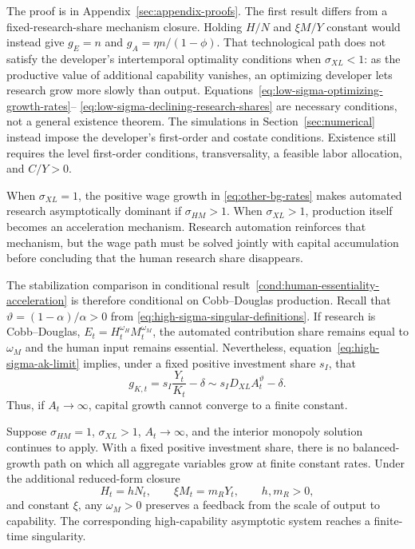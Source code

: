 The proof is in Appendix~\ref{sec:appendix-proofs}. The first result differs from a
fixed-research-share mechanism closure. Holding $H/N$ and
$\xi M/Y$ constant would instead give $g_E=n$ and
$g_A=\eta n/(1-\phi)$. That technological path does not satisfy the developer's
intertemporal optimality conditions when $\sigma_{XL}<1$: as the productive value of
additional capability vanishes, an optimizing developer lets research grow more
slowly than output. Equations~\eqref{eq:low-sigma-optimizing-growth-rates}--
\eqref{eq:low-sigma-declining-research-shares} are necessary conditions, not a
general existence theorem. The simulations in Section~\ref{sec:numerical} instead
impose the developer's first-order and costate conditions. Existence still requires
the level first-order conditions, transversality, a feasible labor allocation, and
$C/Y>0$.

When $\sigma_{XL}=1$, the positive wage growth in
\eqref{eq:other-bg-rates} makes automated research asymptotically dominant if
$\sigma_{HM}>1$. When $\sigma_{XL}>1$, production itself becomes an acceleration
mechanism. Research automation reinforces that mechanism, but the wage path must be
solved jointly with capital accumulation before concluding that the human research
share disappears.

The stabilization comparison in conditional
result~\ref{cond:human-essentiality-acceleration}
is therefore conditional on Cobb--Douglas production. Recall that
$\vartheta=(1-\alpha)/\alpha>0$ from
\eqref{eq:high-sigma-singular-definitions}.
If research is Cobb--Douglas, $E_t=H_t^{\omega_H}M_t^{\omega_M}$, the automated
contribution share remains equal to $\omega_M$ and the human input remains essential.
Nevertheless,
equation~\eqref{eq:high-sigma-ak-limit} implies, under a fixed positive investment
share $s_I$, that
\begin{equation}
    g_{K,t}
    =s_I\frac{Y_t}{K_t}-\delta
    \sim s_ID_{XL} A_t^\vartheta-\delta.
    \label{eq:sigma-hm-one-high-sigma-xl-capital-growth}
\end{equation}
Thus, if $A_t\to\infty$, capital growth cannot converge to a finite constant.

\begin{conditionalresult}
\label{cond:sigma-hm-one-high-sigma-xl}
Suppose $\sigma_{HM}=1$, $\sigma_{XL}>1$, $A_t\to\infty$, and the interior monopoly solution
continues to apply. With a fixed positive investment share, there is no balanced-growth
path on which all aggregate variables grow at finite constant rates. Under the
additional reduced-form closure
\begin{equation}
    H_t=hN_t,\qquad
    \xi M_t=m_RY_t,
    \qquad h,m_R>0,
    \label{eq:sigma-hm-one-fixed-share-closure}
\end{equation}
and constant $\xi$, any $\omega_M>0$ preserves a feedback from the scale of output to
capability. The corresponding high-capability asymptotic system reaches a finite-time
singularity.
\end{conditionalresult}

